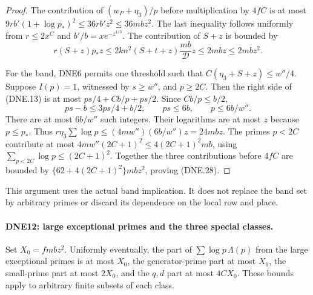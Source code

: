\begin{proof}
The contribution of $(w_P+\eta_3)/p$ before multiplication by
$4fC$ is at most
$9rb'(1+\log p_*)^2\le36rb'z^2\le36mbz^2$.
The last inequality follows uniformly from
$r\le2x^C$ and $b'/b=xe^{-z^{1/3}}$.
The contribution of $S+z$ is bounded by
\[
 r(S+z)p_*z
   \le2kn^2(S+t+z)\frac{mb}{\mathcal D}z
   \le2mbz\le2mbz^2.                                  \tag{DNE.29}
\]

For the band, DNE6 permits one threshold such that
$C(\eta_3+S+z)\le w''/4$.  Suppose $I(p)=1$, witnessed by
$s\ge w''$, and $p\ge2C$.  Then the right side of (DNE.13)
is at most $ps/4+Cb/p+ps/2$.  Since $Cb/p\le b/2$,
\[
 ps-b\le3ps/4+b/2,\qquad ps\le6b,
                         \qquad p\le6b/w''.             \tag{DNE.30}
\]
There are at most $6b/w''$ such integers.  Their logarithms are
at most $z$ because $p\le p_*$.  Thus
$r\eta_3\sum\log p\le(4mw'')(6b/w'')z=24mbz$.
The primes $p<2C$ contribute at most
$4mw''(2C+1)^2\le4(2C+1)^2mb$, using
$\sum_{p<2C}\log p\le(2C+1)^2$.
Together the three contributions before $4fC$ are bounded by
$\{62+4(2C+1)^2\}mbz^2$, proving (DNE.28).
\end{proof}

This argument uses the actual band implication.  It does not
replace the band set by arbitrary primes or discard its dependence
on the local row and place.

\paragraph{DNE12: large exceptional primes and the three special classes.}
\label{claim:DNE12}
Set $X_0=fm bz^2$.  Uniformly eventually, the part of
$\sum\log p\,\Lambda(p)$ from the large exceptional primes is
at most $X_0$, the generator-prime part at most $X_0$, the
small-prime part at most $2X_0$, and the $q,d$ part at most
$4CX_0$.  These bounds apply to arbitrary finite subsets of each class.

